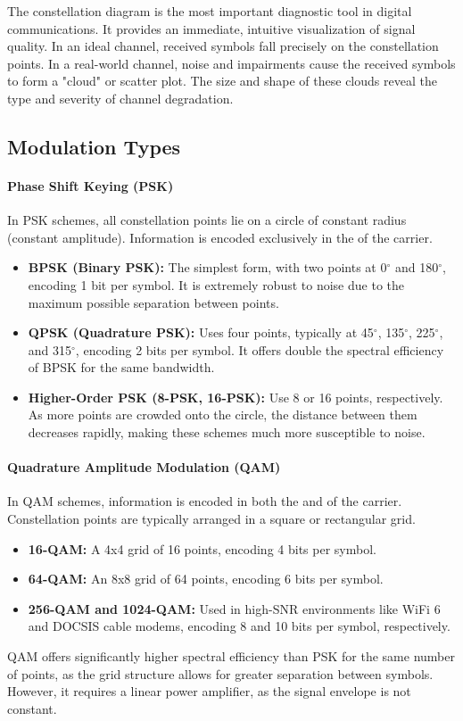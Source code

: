 \begin{keyconcept}
    The constellation diagram is the most important diagnostic tool in digital communications. It provides an immediate, intuitive visualization of signal quality. In an ideal channel, received symbols fall precisely on the constellation points. In a real-world channel, noise and impairments cause the received symbols to form a "cloud" or scatter plot. The size and shape of these clouds reveal the type and severity of channel degradation.
\end{keyconcept}


\subsection{Modulation Types}

\paragraph{Phase Shift Keying (PSK)}
In PSK schemes, all constellation points lie on a circle of constant radius (constant amplitude). Information is encoded exclusively in the  of the carrier.
\begin{itemize}
    \item \textbf{BPSK (Binary PSK):} The simplest form, with two points at 0$^\circ$ and 180$^\circ$, encoding 1 bit per symbol. It is extremely robust to noise due to the maximum possible separation between points.
    \item \textbf{QPSK (Quadrature PSK):} Uses four points, typically at 45$^\circ$, 135$^\circ$, 225$^\circ$, and 315$^\circ$, encoding 2 bits per symbol. It offers double the spectral efficiency of BPSK for the same bandwidth.
    \item \textbf{Higher-Order PSK (8-PSK, 16-PSK):} Use 8 or 16 points, respectively. As more points are crowded onto the circle, the distance between them decreases rapidly, making these schemes much more susceptible to noise.
\end{itemize}

\paragraph{Quadrature Amplitude Modulation (QAM)}
In QAM schemes, information is encoded in both the  and  of the carrier. Constellation points are typically arranged in a square or rectangular grid.
\begin{itemize}
    \item \textbf{16-QAM:} A 4x4 grid of 16 points, encoding 4 bits per symbol.
    \item \textbf{64-QAM:} An 8x8 grid of 64 points, encoding 6 bits per symbol.
    \item \textbf{256-QAM and 1024-QAM:} Used in high-SNR environments like WiFi 6 and DOCSIS cable modems, encoding 8 and 10 bits per symbol, respectively.
\end{itemize}
QAM offers significantly higher spectral efficiency than PSK for the same number of points, as the grid structure allows for greater separation between symbols. However, it requires a linear power amplifier, as the signal envelope is not constant.


